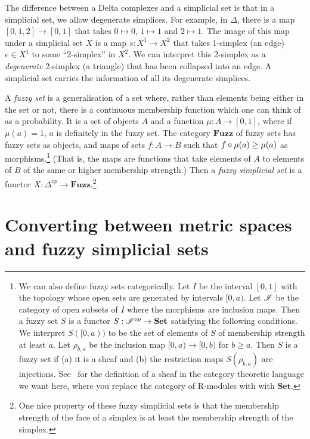 \documentclass[a4paper,12pt,leqno]{article} \usepackage{amsmath}
\theoremstyle{definition}
\begin{document}
The difference between a Delta complexes and a simplicial set is that in
a simplicial set, we allow degenerate simplices.
For example, in $\Delta$,
there is a map $[0, 1, 2]\to [0, 1]$ that takes $0\mapsto 0$, $1\mapsto 1$ and
$2\mapsto 1$.
The image of this map under a simplicial set $X$ is a map $s:
X^1\to X^2$ that takes 1-simplex (an edge) $e\in X^1$ to some ``2-simplex'' in
$X^2$.
We can interpret this 2-simplex as a \emph{degenerate} 2-simplex (a
triangle) that has been collapsed into an edge.
A simplicial set carries the
information of all its degenerate simplices.

A \emph{fuzzy set} is a generalisation of a set where, rather than elements
being either in the set or not, there is a continuous membership function which
one can think of as a probability.
It is a set of objects $A$ and a function
$\mu: A\to [0, 1]$, where if $\mu(a) = 1$, $a$ is definitely in the fuzzy set.
The category $\textbf{Fuzz}$ of fuzzy sets has fuzzy sets as objects, and maps
of sets $f: A\to B$ such that $f\circ \mu(a) \geq \mu(a)$ as morphisms.\footnote{
  We can also define fuzzy sets categorically.
Let $I$ be the interval $[0, 1]$
  with the topology whose open sets are generated by intervals $[0, a)$.
Let
  $\mathscr{I}$ be the category of open subsets of $I$ where the morphisms are
  inclusion maps.
Then a fuzzy set $S$ is a functor $S: \mathscr{I}^{op}\to
  \textbf{Set}$ satisfying the following conditions.
We interpret $S([0, a))$ to
  be the set of elements of $S$ of membership strength at least $a$.
Let
  $\rho_{b, a}$ be the inclusion map $[0, a)\to [0, b)$ for $b\geq a$.
Then $S$
  is a fuzzy set if (a) it is a sheaf and (b) the restriction maps $S(\rho_{b,
  a})$ are injections.
See~\cite{Weng} for the definition of a sheaf in the
  category theoretic language we want here, where you replace the category of
  R-modules with with $\textbf{Set}$.} (That is, the maps are functions that
take elements of $A$ to elements of $B$ of the same or higher membership
strength.) Then a \emph{fuzzy simplicial set} is a functor $X: \Delta^{op}\to
\textbf{Fuzz}$.\footnote{ One nice property of these fuzzy simplicial sets is
that the membership strength of the face of a simplex is at least the membership
strength of the simplex.}

\section{Converting between metric spaces and fuzzy simplicial sets}
\label{section_adjunction}
\end{document}
